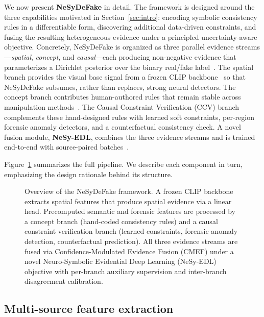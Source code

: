 \documentclass{article}
\begin{document}
We now present \textbf{NeSyDeFake} in detail. The framework is designed around the three capabilities motivated in Section~\ref{sec:intro}: encoding symbolic consistency rules in a differentiable form, discovering additional data-driven constraints, and fusing the resulting heterogeneous evidence under a principled uncertainty-aware objective. Concretely, NeSyDeFake is organized as three parallel evidence streams---\emph{spatial}, \emph{concept}, and \emph{causal}---each producing non-negative evidence that parameterizes a Dirichlet posterior over the binary real/fake label~\citep{sensoy2018evidential}. The spatial branch provides the visual base signal from a frozen CLIP backbone~\citep{radford2021clip} so that NeSyDeFake subsumes, rather than replaces, strong neural detectors. The concept branch contributes human-authored rules that remain stable across manipulation methods~\citep{ekman1978facial}. The Causal Constraint Verification (CCV) branch complements these hand-designed rules with learned soft constraints, per-region forensic anomaly detectors, and a counterfactual consistency check. A novel fusion module, \textbf{NeSy-EDL}, combines the three evidence streams and is trained end-to-end with source-paired batches~\citep{gend}.

Figure~\ref{fig:architecture} summarizes the full pipeline. We describe each component in turn, emphasizing the design rationale behind its structure.

\begin{figure}[t]
  \centering
  \fbox{\rule[-.5cm]{0cm}{4cm} \rule[-.5cm]{12cm}{0cm}}
  \caption{Overview of the NeSyDeFake framework. A frozen CLIP backbone extracts spatial features that produce spatial evidence via a linear head. Precomputed semantic and forensic features are processed by a concept branch (hand-coded consistency rules) and a causal constraint verification branch (learned constraints, forensic anomaly detection, counterfactual prediction). All three evidence streams are fused via Confidence-Modulated Evidence Fusion (CMEF) under a novel Neuro-Symbolic Evidential Deep Learning (NeSy-EDL) objective with per-branch auxiliary supervision and inter-branch disagreement calibration.}
  \label{fig:architecture}
\end{figure}


\subsection{Multi-source feature extraction}
\label{sec:features}
\end{document}

